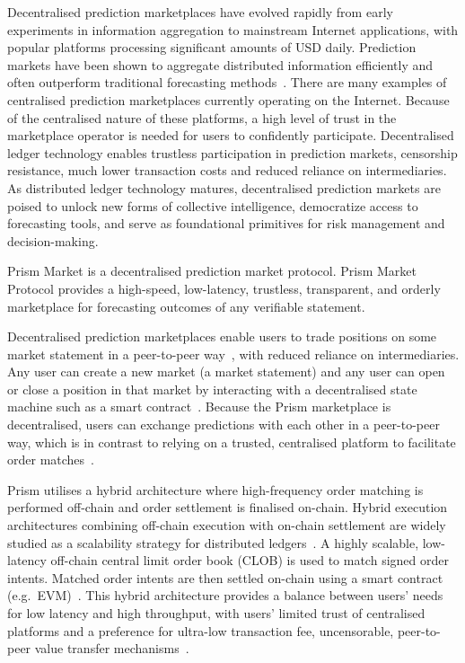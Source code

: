 \documentclass[11pt,a4paper]{article}
\begin{document}
Decentralised prediction marketplaces have evolved rapidly from early experiments in information aggregation to mainstream Internet applications, with popular platforms processing significant amounts of USD daily. Prediction markets have been shown to aggregate distributed information efficiently and often outperform traditional forecasting methods~\cite{hanson2003}\cite{berg2008}\cite{wolfers2004}. There are many examples of centralised prediction marketplaces currently operating on the Internet. Because of the centralised nature of these platforms, a high level of trust in the marketplace operator is needed for users to confidently participate. Decentralised ledger technology enables trustless participation in prediction markets, censorship resistance, much lower transaction costs and reduced reliance on intermediaries. As distributed ledger technology matures, decentralised prediction markets are poised to unlock new forms of collective intelligence, democratize access to forecasting tools, and serve as foundational primitives for risk management and decision-making.

Prism Market is a decentralised prediction market protocol. Prism Market Protocol provides a high-speed, low-latency, trustless, transparent, and orderly marketplace for forecasting outcomes of any verifiable statement.

Decentralised prediction marketplaces enable users to trade positions on some market statement in a peer-to-peer way~\cite{wolfers2004}, with reduced reliance on intermediaries. Any user can create a new market (a market statement) and any user can open or close a position in that market by interacting with a decentralised state machine such as a smart contract~\cite{poon2016}. Because the Prism marketplace is decentralised, users can exchange predictions with each other in a peer-to-peer way, which is in contrast to relying on a trusted, centralised platform to facilitate order matches~\cite{lyons2020}.

Prism utilises a hybrid architecture where high-frequency order matching is performed off-chain and order settlement is finalised on-chain. Hybrid execution architectures combining off-chain execution with on-chain settlement are widely studied as a scalability strategy for distributed ledgers~\cite{baird2016}. A highly scalable, low-latency off-chain central limit order book (CLOB) is used to match signed order intents. Matched order intents are then settled on-chain using a smart contract (e.g.\ EVM)~\cite{nasdaq2019}. This hybrid architecture provides a balance between users' needs for low latency and high throughput, with users' limited trust of centralised platforms and a preference for ultra-low transaction fee, uncensorable, peer-to-peer value transfer mechanisms~\cite{adams2021}.
\end{document}
